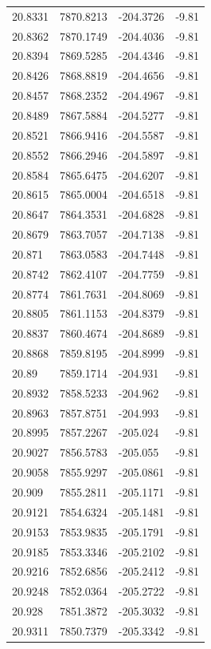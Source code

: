\begin{table}[H]
\begin{tabular}{llll}
20.8331 & 7870.8213 & -204.3726 & -9.81 \\
20.8362 & 7870.1749 & -204.4036 & -9.81 \\
20.8394 & 7869.5285 & -204.4346 & -9.81 \\
20.8426 & 7868.8819 & -204.4656 & -9.81 \\
20.8457 & 7868.2352 & -204.4967 & -9.81 \\
20.8489 & 7867.5884 & -204.5277 & -9.81 \\
20.8521 & 7866.9416 & -204.5587 & -9.81 \\
20.8552 & 7866.2946 & -204.5897 & -9.81 \\
20.8584 & 7865.6475 & -204.6207 & -9.81 \\
20.8615 & 7865.0004 & -204.6518 & -9.81 \\
20.8647 & 7864.3531 & -204.6828 & -9.81 \\
20.8679 & 7863.7057 & -204.7138 & -9.81 \\
20.871 & 7863.0583 & -204.7448 & -9.81 \\
20.8742 & 7862.4107 & -204.7759 & -9.81 \\
20.8774 & 7861.7631 & -204.8069 & -9.81 \\
20.8805 & 7861.1153 & -204.8379 & -9.81 \\
20.8837 & 7860.4674 & -204.8689 & -9.81 \\
20.8868 & 7859.8195 & -204.8999 & -9.81 \\
20.89 & 7859.1714 & -204.931 & -9.81 \\
20.8932 & 7858.5233 & -204.962 & -9.81 \\
20.8963 & 7857.8751 & -204.993 & -9.81 \\
20.8995 & 7857.2267 & -205.024 & -9.81 \\
20.9027 & 7856.5783 & -205.055 & -9.81 \\
20.9058 & 7855.9297 & -205.0861 & -9.81 \\
20.909 & 7855.2811 & -205.1171 & -9.81 \\
20.9121 & 7854.6324 & -205.1481 & -9.81 \\
20.9153 & 7853.9835 & -205.1791 & -9.81 \\
20.9185 & 7853.3346 & -205.2102 & -9.81 \\
20.9216 & 7852.6856 & -205.2412 & -9.81 \\
20.9248 & 7852.0364 & -205.2722 & -9.81 \\
20.928 & 7851.3872 & -205.3032 & -9.81 \\
20.9311 & 7850.7379 & -205.3342 & -9.81 \\

\end{tabular}
\end{table}
